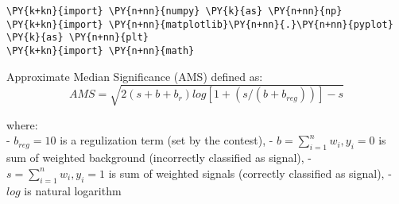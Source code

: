 
{\par%
\vspace{-1\baselineskip}%
}%
\begin{notebookcell}[]%
\begin{addmargin}[\cellleftmargin]{0em}%
{\smaller%
\par%
%
\vspace{-1\smallerfontscale}%
\begin{Verbatim}[commandchars=\\\{\}]
\PY{k+kn}{import} \PY{n+nn}{numpy} \PY{k}{as} \PY{n+nn}{np}
\PY{k+kn}{import} \PY{n+nn}{matplotlib}\PY{n+nn}{.}\PY{n+nn}{pyplot} \PY{k}{as} \PY{n+nn}{plt}
\PY{k+kn}{import} \PY{n+nn}{math}
\end{Verbatim}
%
\par%
\vspace{-1\smallerfontscale}}%
\end{addmargin}
\end{notebookcell}


    Approximate Median Significance (AMS) defined as:\\
\[AMS = \sqrt{2 { (s + b + b_r) log[1 + (s/(b+b_{reg}))] - s}}\]

where:\\
- \(b_{reg} = 10\) is a regulization term (set by the contest), -
\(b = \sum_{i=1}^{n} w_i, y_i=0\) is sum of weighted background
(incorrectly classified as signal), - \(s = \sum_{i=1}^{n} w_i, y_i=1\)
is sum of weighted signals (correctly classified as signal), - \(log\)
is natural logarithm


